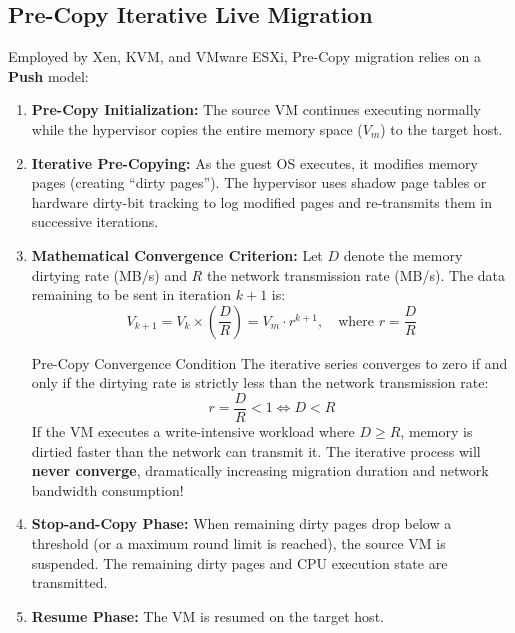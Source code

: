 \documentclass[11pt,a4paper,openany]{report}
\begin{document}
\subsection{Pre-Copy Iterative Live Migration}
Employed by Xen, KVM, and VMware ESXi, Pre-Copy migration relies on a \textbf{Push} model:
\begin{enumerate}[leftmargin=*]
  \item \textbf{Pre-Copy Initialization:} The source VM continues executing normally while the hypervisor copies the entire memory space ($V_m$) to the target host.
  \item \textbf{Iterative Pre-Copying:} As the guest OS executes, it modifies memory pages (creating ``dirty pages''). The hypervisor uses shadow page tables or hardware dirty-bit tracking to log modified pages and re-transmits them in successive iterations.
  \item \textbf{Mathematical Convergence Criterion:}
    Let $D$ denote the memory dirtying rate (MB/s) and $R$ the network transmission rate (MB/s). The data remaining to be sent in iteration $k+1$ is:
    \begin{equation}
    V_{k+1} = V_k \times \left( \frac{D}{R} \right) = V_m \cdot r^{k+1}, \quad \text{where } r = \frac{D}{R}
    \end{equation}
    \begin{thmbox}{Pre-Copy Convergence Condition}
    The iterative series converges to zero if and only if the dirtying rate is strictly less than the network transmission rate:
    \begin{equation}
    r = \frac{D}{R} < 1 \iff D < R
    \end{equation}
    If the VM executes a write-intensive workload where $D \ge R$, memory is dirtied faster than the network can transmit it. The iterative process will \textbf{never converge}, dramatically increasing migration duration and network bandwidth consumption!
    \end{thmbox}
  \item \textbf{Stop-and-Copy Phase:} When remaining dirty pages drop below a threshold (or a maximum round limit is reached), the source VM is suspended. The remaining dirty pages and CPU execution state are transmitted.
  \item \textbf{Resume Phase:} The VM is resumed on the target host.
\end{enumerate}
\end{document}
